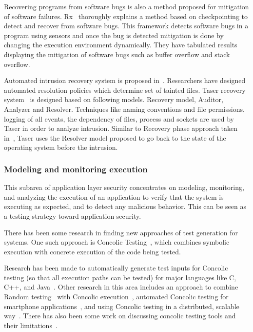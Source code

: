 \documentclass[11pt,letterpaper]{article}
\begin{document}
Recovering programs from software bugs is also a method proposed for mitigation of software failures. Rx~\cite{qin2007} thoroughly explains a method based on checkpointing to detect and recover from software bugs.  This framework detects software bugs in a program using sensors and once the bug is detected mitigation is done by changing the execution environment dynamically. They have tabulated results displaying the mitigation of software bugs such as buffer overflow and stack overflow.

Automated intrusion recovery system is proposed in~\cite{goel2005b}. Researchers have designed automated resolution policies which determine set of tainted files. Taser recovery system~\cite{goel2005b} is designed based on following models. Recovery model, Auditor, Analyzer and Resolver. Techniques like naming conventions and file permissions, logging of all events, the dependency of files, process and sockets are used by Taser in order to analyze intrusion. Similar to Recovery phase approach taken in~\cite{zhang2009b}, Taser uses the Resolver model proposed to go back to the state of the operating system before the intrusion.


\subsubsection{Modeling and monitoring execution}
This subarea of application layer security concentrates on modeling, monitoring, and analyzing the execution of an application to verify that the system is executing as expected, and to detect any malicious behavior. This can be seen as a testing strategy toward application security.

There has been some research in finding new approaches of test generation for systems. One such approach is Concolic Testing~\cite{sen2007concolic}, which combines symbolic execution with concrete execution of the code being tested.

Research has been made to automatically generate test inputs for Concolic testing (so that all execution paths can be tested) for major languages like C, C++, and Java~\cite{garg2013, jayaraman2009, sen2005}. Other research in this area includes an approach to combine Random testing~\cite{bird1983automatic} with Concolic execution~\cite{majumdar2007}, automated Concolic testing for smartphone applications~\cite{anand2012automated}, and using Concolic testing in a distributed, scalable way~\cite{kim2012scalable}. There has also been some work on discussing concolic testing tools and their limitations~\cite{qu2011}.
\end{document}
